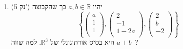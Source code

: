 \documentclass[12pt, a4paper]{article}
\newcommand{\rr}{\mathbb{R}}
\newcommand{\points}[1]{(#1 נק') }
\begin{document}
\begin{enumerate}

\item\points{5}
יהיו
$a,b\in\rr$
כך שהקבוצה
$$\left\{
\begin{pmatrix}
a\\1\\1\\
\end{pmatrix},
\begin{pmatrix}
2\\-1\\1-2a\\
\end{pmatrix},
\begin{pmatrix}
2\\b\\-2\\
\end{pmatrix}
\right\}$$
היא בסיס אורתוגונלי של
$\rr^3$.
למה שווה
$a+b$\ ?
\begin{enumerate}
\end{enumerate}
\pagebreak


\end{enumerate}
\end{document}
